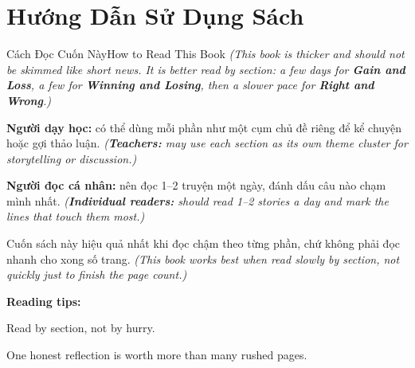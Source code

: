 \chapter*{Hướng Dẫn Sử Dụng Sách}

\begin{truyen}{Cách Đọc Cuốn Này}{How to Read This Book}
\textit{(This book is thicker and should not be skimmed like short news. It is better read by section: a few days for \textbf{Gain and Loss}, a few for \textbf{Winning and Losing}, then a slower pace for \textbf{Right and Wrong}.)}

\textbf{Người dạy học:} có thể dùng mỗi phần như một cụm chủ đề riêng để kể chuyện hoặc gợi thảo luận.
\textit{(\textbf{Teachers:} may use each section as its own theme cluster for storytelling or discussion.)}

\textbf{Người đọc cá nhân:} nên đọc 1--2 truyện một ngày, đánh dấu câu nào chạm mình nhất.
\textit{(\textbf{Individual readers:} should read 1--2 stories a day and mark the lines that touch them most.)}
\end{truyen}

\begin{baihoc}
Cuốn sách này hiệu quả nhất khi đọc chậm theo từng phần, chứ không phải đọc nhanh cho xong số trang.
\textit{(This book works best when read slowly by section, not quickly just to finish the page count.)}
\end{baihoc}

\begin{ghinhoanh}
\textbf{Reading tips:}

Read by section, not by hurry.

One honest reflection is worth more than many rushed pages.
\end{ghinhoanh}

\ngancach